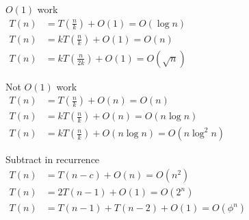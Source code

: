 \documentclass[a4paper]{article}
\begin{document}
\vspace{-1.7\baselineskip}
\hrulefill
\vspace{-1.0\baselineskip}

\begin{multicols}{3}
  {\centering
    $O(1)$ work \\ \vspace{.2cm}
    $ \displaystyle
    \begin{aligned}
      T(n) &= T (\tfrac{n}{k}) + O(1) = O(\log n) \\
      T(n) &= kT (\tfrac{n}{k}) + O(1) = O(n) \\
      T(n) &= kT (\tfrac{n}{2k}) + O(1) = O(\sqrt n)
    \end{aligned}
    $
  \par}
  {\centering
    Not $O(1)$ work \\ \vspace{.2cm}
    $ \displaystyle
    \begin{aligned}
      T(n) &= T (\tfrac{n}{k}) + O(n) = O(n) \\
      T(n) &= kT (\tfrac{n}{k}) + O(n) = O(n \log n) \\
      T(n) &= kT (\tfrac{n}{k}) + O(n \log n) = O(n \log^2 n)
    \end{aligned}
    $
  \par}
  {\centering
    Subtract in recurrence \\ \vspace{.2cm}
    $ \displaystyle
      \begin{aligned}
        T(n) &= T(n-c) + O(n) = O(n^2) \\
        T(n) &= 2T(n-1) + O(1) = O(2^n) \\
        T(n) &= T(n-1) + T(n-2) + O(1) = O(\phi^n)
      \end{aligned}
    $
  \par}
\end{multicols}
\end{document}
